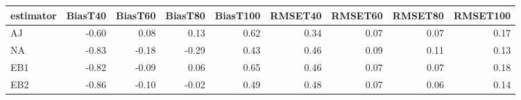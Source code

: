 \begin{table}[ht]
\centering
\begin{tabular}{lrrrrrrrr}
  \toprule
estimator & BiasT40 & BiasT60 & BiasT80 & BiasT100 & RMSET40 & RMSET60 & RMSET80 & RMSET100 \\ 
  \midrule
AJ & -0.60 & 0.08 & 0.13 & 0.62 & 0.34 & 0.07 & 0.07 & 0.17 \\ 
  NA & -0.83 & -0.18 & -0.29 & 0.43 & 0.46 & 0.09 & 0.11 & 0.13 \\ 
  EB1 & -0.82 & -0.09 & 0.06 & 0.65 & 0.46 & 0.07 & 0.07 & 0.18 \\ 
  EB2 & -0.86 & -0.10 & -0.02 & 0.49 & 0.48 & 0.07 & 0.06 & 0.14 \\ 
   \bottomrule
\end{tabular}
\end{table}
